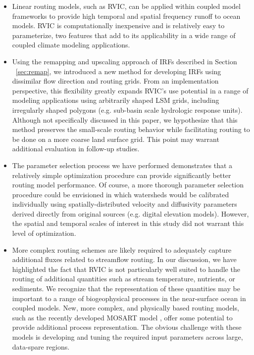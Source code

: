 \documentclass[jgrga, draft]{agutex}
\begin{document}
\begin{article}
\begin{itemize}[leftmargin=+.5in]
  \item Linear routing models, such as RVIC, can be applied within coupled model frameworks to provide high temporal and spatial frequency runoff to ocean models.
  RVIC is computationally inexpensive and is relatively easy to parameterize, two features that add to its applicability in a wide range of coupled climate modeling applications.
  \item Using the remapping and upscaling approach of IRFs described in Section ~\ref{sec:remap}, we introduced a new method for developing IRFs using dissimilar flow direction and routing grids.
  From an implementation perspective, this flexibility greatly expands RVIC's use potential in a range of modeling applications using arbitrarily shaped LSM grids, including irregularly shaped polygons (e.g. sub-basin scale hydrologic response units).
  Although not specifically discussed in this paper, we hypothesize that this method preserves the small-scale routing behavior while facilitating routing to be done on a more coarse land surface grid.
  This point may warrant additional evaluation in follow-up studies.
  \item The parameter selection process we have performed demonstrates that a relatively simple optimization procedure can provide significantly better routing model performance.
  Of course, a more thorough parameter selection procedure could be envisioned in which watersheds would be calibrated individually using spatially-distributed velocity and diffusivity parameters derived directly from original sources (e.g. digital elevation models).
  However, the spatial and temporal scales of interest in this study did not warrant this level of optimization.
  \item More complex routing schemes are likely required to adequately capture additional fluxes related to streamflow routing.
  In our discussion, we have highlighted the fact that RVIC is not particularly well suited to handle the routing of additional quantities such as stream temperature, nutrients, or sediments.
  We recognize that the representation of these quantities may be important to a range of biogeophysical processes in the near-surface ocean in coupled models.
  New, more complex, and physically based routing models, such as the recently developed MOSART model \citep{Li_2013}, offer some potential to provide additional process representation.
  The obvious challenge with these models is developing and tuning the required input parameters across large, data-spare regions.

\end{itemize}
\end{article}
\end{document}
